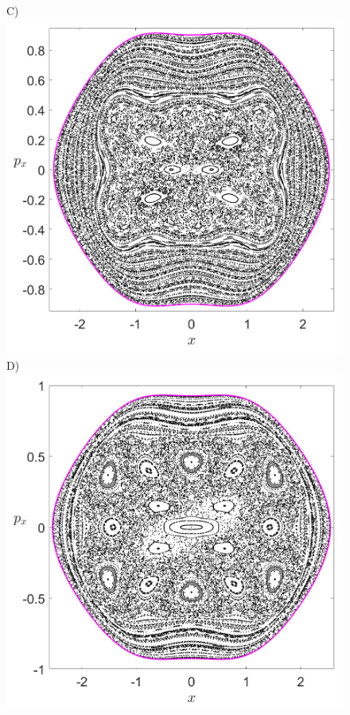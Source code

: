 \documentclass[10pt,aps,onecolumn,superscriptaddress]{revtex4-2}
\begin{document}
\begin{figure}[htbp]
	C)\includegraphics[scale=0.3]{PS_y_0_H_-0_2_w0_1div2_k_sqrt7_min_3delta_d_1.png}
	D)\includegraphics[scale=0.3]{PS_y_0_H_-0_2_w0_1div2_k_sqrt7_min_2delta_d_1.png}

\end{figure}
\end{document}
